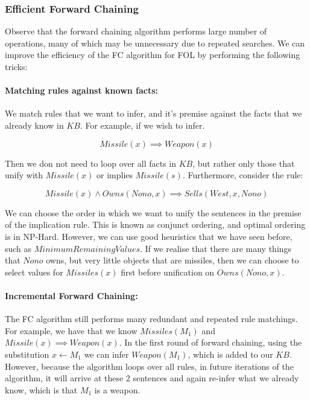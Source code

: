 \documentclass[12pt]{article}
\begin{document}
\subsubsection{Efficient Forward Chaining}

Observe that the forward chaining algorithm performs large number of operations, many of which may be unnecessary due to repeated searches. We can improve the efficiency of the FC algorithm for FOL by performing the following tricks:

\paragraph{Matching rules against known facts:}
We match rules that we want to infer, and it's premise against the facts that we already know in $KB$. For example, if we wish to infer.

\begin{equation*}
Missile(x) \implies Weapon(x)
\end{equation*}

Then we don not need to loop over all facts in $KB$, but rather only those that unify with $Missile(x)$ or implies $Missile(s)$. Furthermore, consider the rule:

\begin{equation*}
Missile(x) \land Owns(Nono, x) \implies Sells(West,x,Nono)
\end{equation*}

We can choose the order in which we want to unify the sentences in the premise of the implication rule. This is known as conjunct ordering, and optimal ordering is in NP-Hard. However, we can use good heuristics that we have seen before, such as $Minimum Remaining Values$. If we realise that there are many things that $Nono$ owns, but very little objects that are missiles, then we can choose to select values for $Missiles(x)$ first before unification on $Owns(Nono,x)$.

\paragraph{Incremental Forward Chaining:}

The FC algorithm still performs many redundant and repeated rule matchings. For example, we have that we know $Missiles(M_1)$ and $Missile(x) \implies Weapon(x)$. In the first round of forward chaining, using the substitution $x \leftarrow M_1$ we can infer $Weapon(M_1)$, which is added to our $KB$. However, because the algorithm loops over all rules, in future iterations of the algorithm, it will arrive at these 2 sentences and again re-infer what we already know, which is that $M_1$ is a weapon.\\
\end{document}
